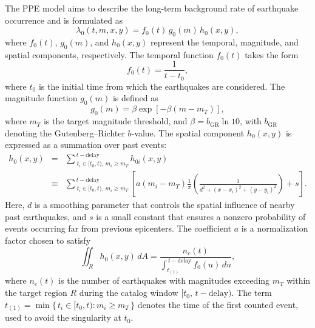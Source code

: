 \documentclass[linenum,doublespace,onecolumn]{SSA-SRL}
\theoremstyle{lemma}
\begin{document}
The PPE model \cite{JK,RE} aims to describe the long-term background rate of earthquake occurrence and is formulated as
\begin{equation}\label{l0}
    \lambda_0(t,m,x,y) = f_0(t)\, g_0(m)\, h_0(x,y),
\end{equation}
where $f_0(t)$, $g_0(m)$, and $h_0(x,y)$ represent the temporal, magnitude, and spatial components, respectively.  
The temporal function $f_0(t)$ takes the form
\begin{equation}\label{f0}
    f_0(t) = \frac{1}{t - t_0},
\end{equation}
where $t_0$ is the initial time from which the earthquakes are considered.  
The magnitude function $g_0(m)$ is defined as
\begin{equation}\label{g0}
    g_0(m) = \beta \exp\!\left[-\beta(m - m_T)\right],
\end{equation}
where $m_T$ is the target magnitude threshold, and $\beta = b_{\mathrm{GR}}\ln 10$, with $b_{\mathrm{GR}}$ denoting the Gutenberg--Richter $b$-value.  
The spatial component $h_0(x,y)$ is expressed as a summation over past events:
\begin{eqnarray}\label{h0}
 \nonumber h_0(x,y) & = & \sum\nolimits^{\,t-\text{delay}}_{\;t_i \in [t_0,t),\,m_i \ge m_T} h_{0i}(x,y) \\
& \equiv & \sum\nolimits^{\,t-\text{delay}}_{\;t_i \in [t_0,t),\,m_i \ge m_T} \!\left[a(m_i - m_T)\frac{1}{\pi}\!\left(\frac{1}{d^2 + (x - x_i)^2 + (y - y_i)^2}\right) + s\right].
\end{eqnarray}
Here, $d$ is a smoothing parameter that controls the spatial influence of nearby past earthquakes, and $s$ is a small constant that ensures a nonzero probability of events occurring far from previous epicenters. The coefficient $a$ is a normalization factor chosen to satisfy
\begin{equation}\label{nc}
\iint_R h_0(x,y)\,dA
= \frac{n_c(t)}{\displaystyle\int_{t_{(1)}}^{\,t-\text{delay}}\! f_0(u)\,du},
\end{equation}
where $n_c(t)$ is the number of earthquakes with magnitudes exceeding $m_T$ within the target region $R$ during the catalog window $[t_0,\,t-\text{delay})$. The term $t_{(1)} = \min\{\,t_i \in [t_0, t) : m_i \ge m_T\,\}$ denotes the time of the first counted event, used to avoid the singularity at $t_0$.
\end{document}
